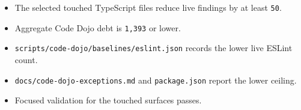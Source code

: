 \begin{itemize}
\tightlist
\item
  The selected touched TypeScript files reduce live findings by at least \texttt{5\allowbreak{}0}.
\item
  Aggregate Code Dojo debt is \texttt{1\allowbreak{},\allowbreak{}3\allowbreak{}9\allowbreak{}3} or lower.
\item
  \texttt{s\allowbreak{}c\allowbreak{}r\allowbreak{}i\allowbreak{}p\allowbreak{}t\allowbreak{}s\allowbreak{}/\allowbreak{}c\allowbreak{}o\allowbreak{}d\allowbreak{}e\allowbreak{}-\allowbreak{}d\allowbreak{}o\allowbreak{}j\allowbreak{}o\allowbreak{}/\allowbreak{}b\allowbreak{}a\allowbreak{}s\allowbreak{}e\allowbreak{}l\allowbreak{}i\allowbreak{}n\allowbreak{}e\allowbreak{}s\allowbreak{}/\allowbreak{}e\allowbreak{}s\allowbreak{}l\allowbreak{}i\allowbreak{}n\allowbreak{}t\allowbreak{}.\allowbreak{}j\allowbreak{}s\allowbreak{}o\allowbreak{}n} records the lower live ESLint count.
\item
  \texttt{d\allowbreak{}o\allowbreak{}c\allowbreak{}s\allowbreak{}/\allowbreak{}c\allowbreak{}o\allowbreak{}d\allowbreak{}e\allowbreak{}-\allowbreak{}d\allowbreak{}o\allowbreak{}j\allowbreak{}o\allowbreak{}-\allowbreak{}e\allowbreak{}x\allowbreak{}c\allowbreak{}e\allowbreak{}p\allowbreak{}t\allowbreak{}i\allowbreak{}o\allowbreak{}n\allowbreak{}s\allowbreak{}.\allowbreak{}m\allowbreak{}d} and \texttt{p\allowbreak{}a\allowbreak{}c\allowbreak{}k\allowbreak{}a\allowbreak{}g\allowbreak{}e\allowbreak{}.\allowbreak{}j\allowbreak{}s\allowbreak{}o\allowbreak{}n} report the lower ceiling.
\item
  Focused validation for the touched surfaces passes.
\end{itemize}

